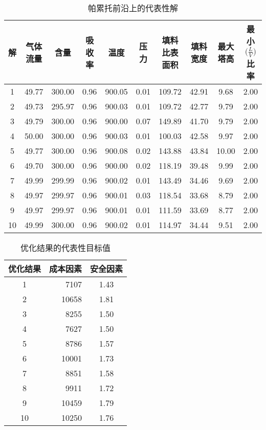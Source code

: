 \begin{table}[h]
	\footnotesize
	\centering
	\caption{帕累托前沿上的代表性解}
	\label{tab:optimal_solutions}
	\begin{tabular}{cccccccccc}
		\hline
		解 & 气体流量 & \ce{SO2}含量 & 吸收率 & 温度 & 压力 & 填料比表面积 & 填料宽度 & 最大塔高 & 最小$\big(\frac{L}{V}\big)$比率 \\
		\hline
		1 & 49.77 & 300.00 & 0.96 & 900.05 & 0.01 & 109.72 & 42.91 & 9.68 & 2.00 \\
		2 & 49.73 & 295.97 & 0.96 & 900.03 & 0.01 & 109.72 & 42.77 & 9.79 & 2.00 \\
		3 & 49.79 & 300.00 & 0.96 & 900.00 & 0.07 & 149.89 & 41.70 & 9.79 & 2.00 \\
		4 & 50.00 & 300.00 & 0.96 & 900.03 & 0.01 & 100.03 & 42.58 & 9.97 & 2.00 \\
		5 & 49.77 & 300.00 & 0.96 & 900.08 & 0.02 & 143.88 & 43.84 & 10.00 & 2.00 \\
		6 & 49.70 & 300.00 & 0.96 & 900.00 & 0.02 & 118.19 & 39.48 & 9.99 & 2.00 \\
		7 & 49.99 & 299.99 & 0.96 & 900.02 & 0.01 & 143.49 & 34.46 & 9.69 & 2.00 \\
		8 & 49.97 & 299.97 & 0.96 & 900.01 & 0.03 & 118.54 & 33.68 & 8.79 & 2.00 \\
		9 & 49.97 & 299.97 & 0.96 & 900.01 & 0.01 & 111.59 & 33.69 & 8.77 & 2.00 \\
		10 & 49.99 & 300.00 & 0.96 & 900.02 & 0.01 & 114.97 & 34.44 & 9.51 & 2.00 \\
		\hline
	\end{tabular}
\end{table}

\clearpage

\begin{table}[h]
	\small
	\centering
	\caption{优化结果的代表性目标值}
	\label{tab:objective_values}
	\begin{tabular}{c@{\hspace{0.35\textwidth}}r@{\hspace{0.3\textwidth}}c}
		\hline
		优化结果 & 成本因素 & 安全因素 \\
		\hline
		1 & 7107 & 1.43 \\
		2 & 10658 & 1.81 \\
		3 & 8255 & 1.50 \\
		4 & 7627 & 1.50 \\
		5 & 8786 & 1.57 \\
		6 & 10001 & 1.73 \\
		7 & 8851 & 1.58 \\
		8 & 9911 & 1.72 \\
		9 & 10459 & 1.79 \\
		10 & 10250 & 1.76 \\
		\hline
	\end{tabular}
\end{table}

